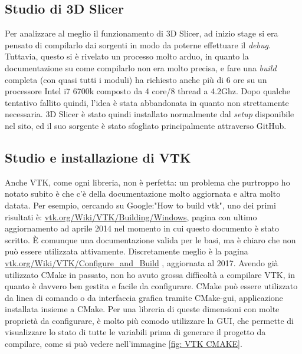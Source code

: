 \subsection{Studio di 3D Slicer}
Per analizzare al meglio il funzionamento di 3D Slicer, ad inizio stage si era pensato di compilarlo dai sorgenti in modo da poterne effettuare il \emph{debug}. Tuttavia, questo si è rivelato un processo molto arduo, in quanto la documentazione su come compilarlo non era molto precisa, e fare una \emph{build} completa (con quasi tutti i moduli) ha richiesto anche più di 6 ore su un processore Intel i7 6700k composto da 4 core/8 thread a 4.2Ghz. Dopo qualche tentativo fallito quindi, l'idea è stata abbandonata in quanto non strettamente necessaria. 3D Slicer è stato quindi installato normalmente dal \emph{setup} disponibile nel sito, ed il suo sorgente è stato sfogliato principalmente attraverso GitHub.

\subsection{Studio e installazione di VTK}
Anche VTK, come ogni libreria, non è perfetta: un problema che purtroppo ho notato subito è che c'è della documentazione molto aggiornata e altra molto datata. Per esempio, cercando su Google:"How to build vtk", uno dei primi risultati è: \href{https://vtk.org/Wiki/VTK/Building/Windows}{vtk.org/Wiki/VTK/Building/Windows}, pagina con ultimo aggiornamento ad aprile 2014 nel momento in cui questo documento è stato scritto. \`E comunque una documentazione valida per le basi, ma è chiaro che non può essere utilizzata attivamente. Discretamente meglio è la pagina \href{https://vtk.org/Wiki/VTK/Configure_and_Build}{vtk.org/Wiki/VTK/Configure\_and\_Build} , aggiornata al 2017. Avendo già utilizzato CMake in passato, non ho avuto grossa difficoltà a compilare VTK, in quanto è davvero ben gestita e facile da configurare. CMake può essere utilizzato da linea di comando o da interfaccia grafica tramite CMake-gui, applicazione installata insieme a CMake. Per una libreria di queste dimensioni con molte proprietà da configurare, è molto più comodo utilizzare la GUI, che permette di visualizzare lo stato di tutte le variabili prima di generare il progetto da compilare, come si può vedere nell'immagine \ref{fig: VTK CMAKE}.

